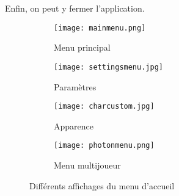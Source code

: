 \documentclass[../doc.tex]{subfiles}
\begin{document}
    Enfin, on peut y fermer l'application.
    
    \begin{figure}[hbt!]
                \centering
                \captionsetup{justification=centering}
                \begin{subfigure}[b]{0.3\textwidth}
                    \texttt{[image: mainmenu.png]} 
                    \caption{Menu principal}
                \end{subfigure}
                \hspace{150pt}
                \begin{subfigure}[b]{0.3\textwidth}
                    \texttt{[image: settingsmenu.jpg]} 
                    \caption{Paramètres}
                \end{subfigure}
                \begin{subfigure}[b]{0.3\textwidth}
                    \texttt{[image: charcustom.jpg]} 
                    \caption{Apparence}
                \end{subfigure}
                \begin{subfigure}[b]{0.3\textwidth}
                    \texttt{[image: photonmenu.png]} 
                    \caption{Menu multijoueur}
                \end{subfigure}
                \caption{Différents affichages du menu d'accueil}
    \end{figure}
\end{document}
